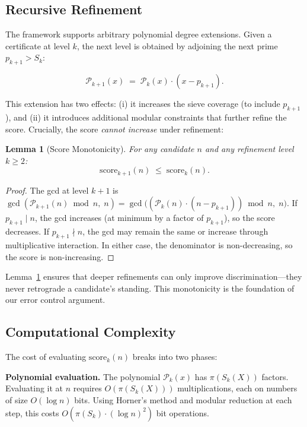 \documentclass[11pt]{article}
\newtheorem{lemma}{Lemma}
\begin{document}
\subsection{Recursive Refinement}

The framework supports arbitrary polynomial degree extensions. Given a certificate
at level $k$, the next level is obtained by adjoining the next prime $p_{k+1} > S_k$:

\begin{equation}
\mathcal{P}_{k+1}(x) \;=\; \mathcal{P}_k(x) \cdot (x - p_{k+1}).
\end{equation}

\noindent This extension has two effects: (i) it increases the sieve coverage
(to include $p_{k+1}$), and (ii) it introduces additional modular constraints
that further refine the score. Crucially, the score \emph{cannot increase} under
refinement:

\begin{lemma}[Score Monotonicity]
\label{lem:monotone}
For any candidate $n$ and any refinement level $k \ge 2$:
\begin{equation}
\mathrm{score}_{k+1}(n) \;\le\; \mathrm{score}_k(n).
\end{equation}
\end{lemma}

\begin{proof}
The gcd at level $k+1$ is
$\gcd(\mathcal{P}_{k+1}(n)\bmod n,\; n) = \gcd\!\bigl((\mathcal{P}_k(n)\cdot(n-p_{k+1}))\bmod n,\; n\bigr)$.
If $p_{k+1}\mid n$, the gcd increases (at minimum by a factor of $p_{k+1}$),
so the score decreases. If $p_{k+1}\nmid n$, the gcd may remain the same or
increase through multiplicative interaction. In either case, the denominator
is non-decreasing, so the score is non-increasing.
\end{proof}

\noindent Lemma~\ref{lem:monotone} ensures that deeper refinements can only
improve discrimination---they never retrograde a candidate's standing. This
monotonicity is the foundation of our error control argument.

\subsection{Computational Complexity}

The cost of evaluating $\mathrm{score}_k(n)$ breaks into two phases:

\noindent\textbf{Polynomial evaluation.} The polynomial $\mathcal{P}_k(x)$ has
$\pi(S_k(X))$ factors. Evaluating it at $n$ requires $O(\pi(S_k(X)))$
multiplications, each on numbers of size $O(\log n)$ bits. Using Horner's
method and modular reduction at each step, this costs
$O(\pi(S_k) \cdot (\log n)^2)$ bit operations.
\end{document}
